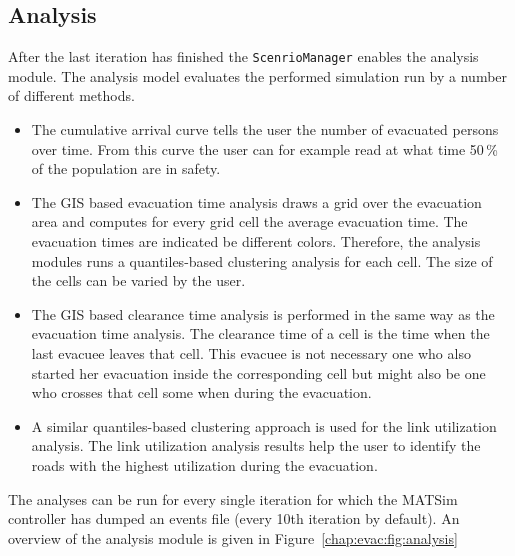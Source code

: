 \subsection{Analysis}
After the last iteration has finished the \lstinline|ScenrioManager| enables the analysis module. The analysis model evaluates the performed simulation run by a number of different methods. 
\begin{itemize}
\item The cumulative arrival curve tells the user the number of evacuated persons over time. From this curve the user can for example read at what time 50\,\% of the population are in safety.
\item The GIS based evacuation time analysis draws a grid over the evacuation area and computes for every grid cell the average evacuation time. The evacuation times are indicated be different colors. Therefore, the analysis modules runs a quantiles-based clustering analysis for each cell. The size of the cells can be varied  by the user.
\item The GIS based clearance time analysis is performed in the same way as the evacuation time  analysis. The clearance time of a cell is the time when the last evacuee leaves that cell. This evacuee is not necessary one who also started her evacuation inside the corresponding cell but might also be one who crosses that cell some when during the evacuation.
\item A similar quantiles-based clustering approach is used for the link utilization analysis. The link utilization analysis results help the user to identify the roads with the highest utilization during the evacuation.
\end{itemize}
The analyses can be run for every single iteration for which the MATSim controller has dumped an events file (every 10th iteration by default). An overview of the analysis module is given in Figure~\ref{chap:evac:fig:analysis}

